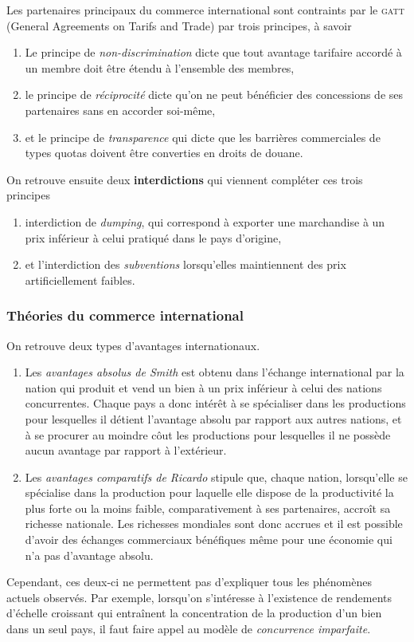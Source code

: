 Les partenaires principaux du commerce international sont contraints par le
\textsc{gatt} (General Agreements on Tarifs and Trade) par trois principes,
à savoir
\begin{enumerate}
  \item Le principe de \emph{non-discrimination} dicte que tout avantage tarifaire accordé
  à un membre doit être étendu à l'ensemble des membres,
  \item le principe de \emph{réciprocité} dicte qu'on ne peut bénéficier des concessions
  de ses partenaires sans en accorder soi-même,
  \item et le principe de \emph{transparence} qui dicte que les barrières commerciales de
  types quotas doivent être converties en droits de douane.
\end{enumerate}
On retrouve ensuite deux \textbf{interdictions} qui viennent compléter ces trois principes
\begin{enumerate}
  \item interdiction de \emph{dumping}, qui correspond à  exporter une marchandise 
  à un prix inférieur à celui pratiqué dans le pays d'origine,
  \item et l'interdiction des \emph{subventions} lorsqu'elles maintiennent des prix
  artificiellement faibles.
\end{enumerate}


\subsubsection{Théories du commerce international} %
\label{ssub:theories_du_commerce_international}
On retrouve deux types d'avantages internationaux.
\begin{enumerate}
  \item Les \emph{avantages absolus de Smith} est obtenu dans l'échange
  international par la nation qui produit et vend un bien à un prix inférieur
  à celui des nations concurrentes.
  Chaque pays a donc intérêt à se spécialiser dans les productions pour lesquelles
  il détient l'avantage absolu par rapport aux autres nations,
  et à se procurer au moindre côut les productions pour lesquelles 
  il ne possède aucun avantage par rapport à l'extérieur.
  \item Les \emph{avantages comparatifs de Ricardo} stipule que, chaque nation,
  lorsqu'elle se spécialise dans la production pour laquelle elle dispose de la 
  productivité la plus forte ou la moins faible, comparativement à ses partenaires,
  accroît sa richesse nationale. Les richesses mondiales sont donc accrues 
  et il est possible d'avoir des échanges commerciaux bénéfiques même pour 
  une économie qui n'a pas d'avantage absolu.
\end{enumerate}
Cependant, ces deux-ci ne permettent pas d'expliquer tous les phénomènes
actuels observés.
Par exemple, lorsqu'on s'intéresse à l'existence de rendements d'échelle
croissant qui entraînent la concentration de la production d'un bien 
dans un seul pays, il faut faire appel au modèle de \emph{concurrence imparfaite}.

